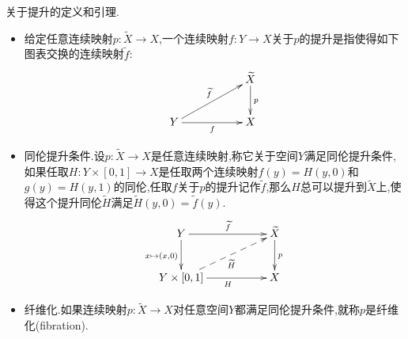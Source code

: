关于提升的定义和引理.
\begin{itemize}
	\item 给定任意连续映射$p:\widetilde{X}\to X$,一个连续映射$f:Y\to X$关于$p$的提升是指使得如下图表交换的连续映射$\widetilde{f}$:
	$$\xymatrix{&&\widetilde{X}\ar[d]^p\\Y\ar[rr]_f\ar[urr]^{\widetilde{f}}&&X}$$
	\item 同伦提升条件.设$p:\widetilde{X}\to X$是任意连续映射,称它关于空间$Y$满足同伦提升条件,如果任取$H:Y\times[0,1]\to X$是任取两个连续映射$f(y)=H(y,0)$和$g(y)=H(y,1)$的同伦,任取$f$关于$p$的提升记作$\widetilde{f}$,那么$H$总可以提升到$\widetilde{X}$上,使得这个提升同伦$\widetilde{H}$满足$\widetilde{H}(y,0)=\widetilde{f}(y)$.
	$$\xymatrix{Y\ar[rr]^{\widetilde{f}}\ar[d]_{x\mapsto(x,0)}&&\widetilde{X}\ar[d]^p\\Y\times[0,1]\ar[rr]_H\ar@{-->}[urr]_{\widetilde{H}}&&X}$$
	\item 纤维化.如果连续映射$p:\widetilde{X}\to X$对任意空间$Y$都满足同伦提升条件,就称$p$是纤维化(fibration).
\end{itemize}
